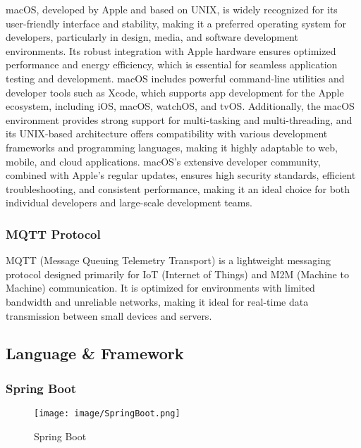 \documentclass[conference]{IEEEtran}
\begin{document}
\noindent macOS, developed by Apple and based on UNIX, is widely recognized for its user-friendly interface and stability, making it a preferred operating system for developers, particularly in design, media, and software development environments. Its robust integration with Apple hardware ensures optimized performance and energy efficiency, which is essential for seamless application testing and development. macOS includes powerful command-line utilities and developer tools such as Xcode, which supports app development for the Apple ecosystem, including iOS, macOS, watchOS, and tvOS. Additionally, the macOS environment provides strong support for multi-tasking and multi-threading, and its UNIX-based architecture offers compatibility with various development frameworks and programming languages, making it highly adaptable to web, mobile, and cloud applications. macOS’s extensive developer community, combined with Apple’s regular updates, ensures high security standards, efficient troubleshooting, and consistent performance, making it an ideal choice for both individual developers and large-scale development teams. \\


\subsubsection{MQTT Protocol}

\noindent MQTT (Message Queuing Telemetry Transport) is a lightweight messaging protocol designed primarily for IoT (Internet of Things) and M2M (Machine to Machine) communication. It is optimized for environments with limited bandwidth and unreliable networks, making it ideal for real-time data transmission between small devices and servers.\\

\subsection{Language \& Framework}

\subsubsection{Spring Boot}

\begin{figure}[h!]
    \centering
    \texttt{[image: image/SpringBoot.png]}
    \caption{Spring Boot}
    \label{fig:enter-label}
\end{figure}
\end{document}
